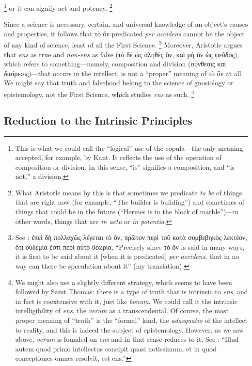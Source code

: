 %
\footnote{This is what we could call the “logical” use of the copula—the only meaning accepted, for example, by Kant. It reflects the use of the operation of composition or division. In this sense, “is” signifies a composition, and “is not,” a division.} or it can signify act and potency.%
%
\footnote{What Aristotle means by this is that sometimes we predicate \emph{to be} of things that are right now (for example, “The builder is building”) and sometimes of things that could be in the future (“Hermes is in the block of marble”)—in other words, things that are \emph{in actu} or \emph{in potentia}.}

Since a science is necessary, certain, and universal knowledge of an object’s causes and properties, it follows that τὸ ὄν predicated \emph{per accidens} cannot be the object of any kind of science, least of all the First Science.%
%
\footnote{See \cite[Ε,~2, 1026b1-3]{aristotle:metaphysics}: ἐπεὶ δὴ πολλαχῶς λέγεται τὸ ὄν, πρῶτον περὶ τοῦ κατὰ συμβεβηκὸς λεκτέον, ὅτι οὐδεμία ἐστὶ περὶ αὐτὸ θεωρία, “Precisely since τὸ ὄν is said in many ways, it is first to be said about it [when it is predicated] \emph{per accidens}, that in no way can there be speculation about it” (my translation).}
%
Moreover, Aristotle argues that \emph{ens} as true and \emph{non-ens} as false (τὸ δὲ ὡς ἀληθὲς ὄν, καὶ μὴ ὂν ὡς ψεῦδος), which refers to something—namely, composition and division (σύνθεσις καὶ διαίρεσις)—that occurs in the intellect, is not a “proper” meaning of τὸ ὄν at all. We might say that truth and falsehood belong to the science of gnosiology or epistemology, not the First Science, which studies \emph{ens} as such.%
%
\footnote{We might also use a slightly different strategy, which seems to have been followed by Saint Thomas: there is a type of truth that is intrinsic to \emph{ens}, and in fact is coextensive with it, just like \emph{bonum}. We could call it the intrinsic intelligibility of \emph{ens}, the \emph{verum} as a transcendental. Of course, the most proper meaning of “truth” is the “formal” kind, the \emph{adaequatio} of the intellect to reality, and this is indeed the subject of epistemology. However, as we saw above, \emph{verum} is founded on \emph{ens} and in that sense reduces to it. See \cite[q.~1, a.~1, co.:]{st:deveritate}: “Illud autem quod primo intellectus concipit quasi notissimum, et in quod conceptiones omnes resolvit, est ens.”}

\subsection{Reduction to the Intrinsic Principles}

